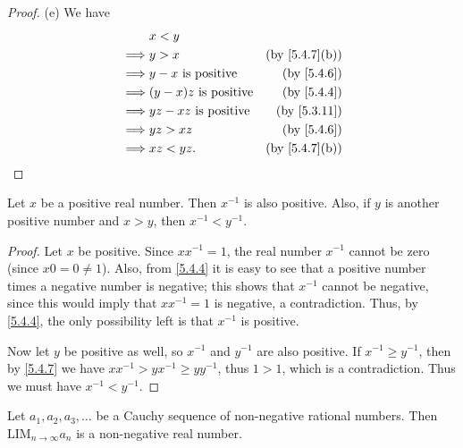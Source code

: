 \begin{proof}{(e)}
  We have
  \begin{align*}
             & x < y                                                      \\
    \implies & y > x                        & \text{(by \cref{5.4.7}(b))} \\
    \implies & y - x \text{ is positive}    & \text{(by \cref{5.4.6})}    \\
    \implies & (y - x)z \text{ is positive} & \text{(by \cref{5.4.4})}    \\
    \implies & yz - xz \text{ is positive}  & \text{(by \cref{5.3.11})}   \\
    \implies & yz > xz                      & \text{(by \cref{5.4.6})}    \\
    \implies & xz < yz.                     & \text{(by \cref{5.4.7}(b))}
  \end{align*}
\end{proof}

\begin{proposition}\label{5.4.8}
  Let \(x\) be a positive real number.
  Then \(x^{-1}\) is also positive.
  Also, if \(y\) is another positive number and \(x > y\), then \(x^{-1} < y^{-1}\).
\end{proposition}

\begin{proof}
  Let \(x\) be positive.
  Since \(xx^{-1} = 1\), the real number \(x^{-1}\) cannot be zero (since \(x0 = 0 \neq 1\)).
  Also, from \cref{5.4.4} it is easy to see that a positive number times a negative number is negative;
  this shows that \(x^{-1}\) cannot be negative, since this would imply that \(xx^{-1} = 1\) is negative, a contradiction.
  Thus, by \cref{5.4.4}, the only possibility left is that \(x^{-1}\) is positive.

  Now let \(y\) be positive as well, so \(x^{-1}\) and \(y^{-1}\) are also positive.
  If \(x^{-1} \geq y^{-1}\), then by \cref{5.4.7} we have \(xx^{-1} > yx^{-1} \geq yy^{-1}\), thus \(1 > 1\), which is a contradiction.
  Thus we must have \(x^{-1} < y^{-1}\).
\end{proof}

\begin{proposition}\label{5.4.9}
  Let \(a_1, a_2, a_3, \dots\) be a Cauchy sequence of non-negative rational numbers.
  Then \(\text{LIM}_{n \to \infty} a_n\) is a non-negative real number.
\end{proposition}

